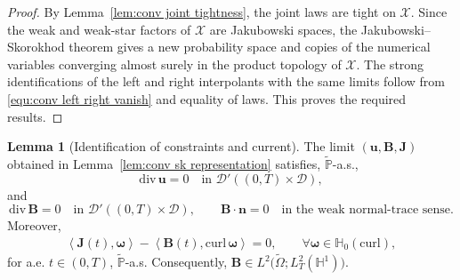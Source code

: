 \documentclass[11pt, reqno]{amsart}
\theoremstyle{definition}
\newtheorem{lemma}[theorem]{Lemma}
\numberwithin{equation}{section}
\newcommand{\curl}{\mathrm{curl}\,}
\newcommand{\divg}{\mathrm{div}\,}
\newcommand{\bff}{\boldsymbol}
\newcommand{\bb}{\mathbb}
\newcommand{\inpro}[2]{\left\langle#1,#2\right\rangle}
\newcommand{\hzerocurl}{\mathbb{H}_0(\mathrm{curl})}
\begin{document}
\begin{proof}
	By Lemma~\ref{lem:conv joint tightness}, the joint laws are tight on
	$\mathcal X$. Since the weak and weak-star factors of $\mathcal X$ are
	Jakubowski spaces, the Jakubowski--Skorokhod theorem gives a new probability
	space and copies of the numerical variables converging almost surely in the
	product topology of $\mathcal X$. The strong identifications of the left and
	right interpolants with the same limits follow from
	\eqref{equ:conv left right vanish} and equality of laws. This proves the required results.
\end{proof}


\begin{lemma}[Identification of constraints and current]
	\label{lem:conv constraints current}
	The limit $(\bff u,\bff B,\bff J)$ obtained in
	Lemma~\ref{lem:conv sk representation} satisfies, $\widetilde{\bb P}$-a.s.,
	\[
	\divg\bff u=0
	\quad\text{in }\mathcal D'((0,T)\times\mathscr D),
	\]
	and
	\[
	\divg\bff B=0
	\quad\text{in }\mathcal D'((0,T)\times\mathscr D),
	\qquad
	\bff B\cdot\bff n=0
	\quad\text{in the weak normal-trace sense}.
	\]
	Moreover,
	\begin{align}
		\label{equ:conv current identified}
		\inpro{\bff J(t)}{\bff\omega}
		-
		\inpro{\bff B(t)}{\curl\bff\omega}
		=0,
		\qquad
		\forall\bff\omega\in\hzerocurl,
	\end{align}
	for a.e. $t\in(0,T)$, $\widetilde{\bb P}$-a.s. Consequently, $\bff B\in
	L^2\bigl(\widetilde\Omega;L^2_T(\bb H^1)\bigr)$.
\end{lemma}
\end{document}
